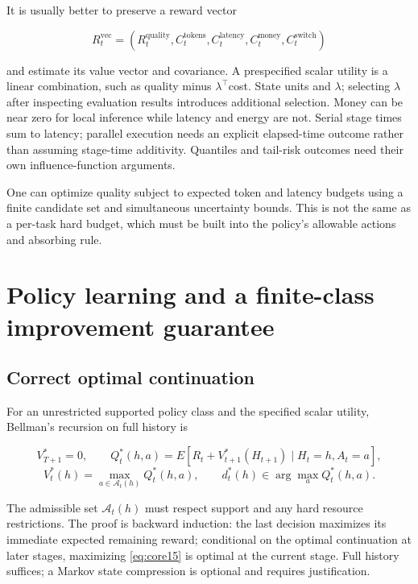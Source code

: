 It is usually better to preserve a reward vector

\[
R_t^{\mathrm{vec}}=(R_t^{\mathrm{quality}},C_t^{\mathrm{tokens}},
C_t^{\mathrm{latency}},C_t^{\mathrm{money}},C_t^{\mathrm{switch}})
\]

and estimate its value vector and covariance. A prespecified scalar utility is a linear combination, such as quality minus \(\lambda^\top\)cost. State units and \(\lambda\); selecting \(\lambda\) after inspecting evaluation results introduces additional selection. Money can be near zero for local inference while latency and energy are not. Serial stage times sum to latency; parallel execution needs an explicit elapsed-time outcome rather than assuming stage-time additivity. Quantiles and tail-risk outcomes need their own influence-function arguments.

One can optimize quality subject to expected token and latency budgets using a finite candidate set and simultaneous uncertainty bounds. This is not the same as a per-task hard budget, which must be built into the policy's allowable actions and absorbing rule.

\section{Policy learning and a finite-class improvement guarantee}\label{policy-learning-and-a-finite-class-improvement-guarantee}

\subsection{Correct optimal continuation}\label{correct-optimal-continuation}

For an unrestricted supported policy class and the specified scalar utility, Bellman's recursion on full history is

\[
V_{T+1}^{*}=0,\qquad
Q_t^{*}(h,a)=E[R_t+V_{t+1}^{*}(H_{t+1})\mid H_t=h,A_t=a],
\] \begin{equation}\label{eq:core15}
V_t^{*}(h)=\max_{a\in\mathcal A_t(h)}Q_t^{*}(h,a),\qquad
d_t^{*}(h)\in\arg\max_aQ_t^{*}(h,a).
\end{equation}

The admissible set \(\mathcal A_t(h)\) must respect support and any hard resource restrictions. The proof is backward induction: the last decision maximizes its immediate expected remaining reward; conditional on the optimal continuation at later stages, maximizing \eqref{eq:core15} is optimal at the current stage. Full history suffices; a Markov state compression is optional and requires justification.

